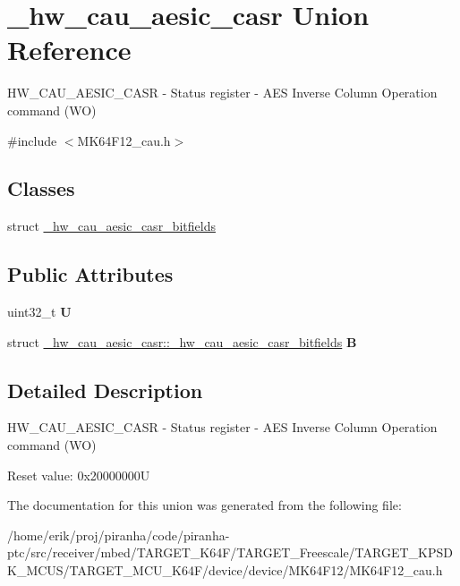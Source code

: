 \hypertarget{union__hw__cau__aesic__casr}{}\section{\+\_\+hw\+\_\+cau\+\_\+aesic\+\_\+casr Union Reference}
\label{union__hw__cau__aesic__casr}


H\+W\+\_\+\+C\+A\+U\+\_\+\+A\+E\+S\+I\+C\+\_\+\+C\+A\+SR -\/ Status register -\/ A\+ES Inverse Column Operation command (WO)  




{\ttfamily \#include $<$M\+K64\+F12\+\_\+cau.\+h$>$}

\subsection*{Classes}
\begin{DoxyCompactItemize}
\item 
struct \hyperlink{struct__hw__cau__aesic__casr_1_1__hw__cau__aesic__casr__bitfields}{\+\_\+hw\+\_\+cau\+\_\+aesic\+\_\+casr\+\_\+bitfields}
\end{DoxyCompactItemize}
\subsection*{Public Attributes}
\begin{DoxyCompactItemize}
\item 
uint32\+\_\+t {\bfseries U}\hypertarget{union__hw__cau__aesic__casr_a73b633957c2c868f374f36d24749867f}{}\label{union__hw__cau__aesic__casr_a73b633957c2c868f374f36d24749867f}

\item 
struct \hyperlink{struct__hw__cau__aesic__casr_1_1__hw__cau__aesic__casr__bitfields}{\+\_\+hw\+\_\+cau\+\_\+aesic\+\_\+casr\+::\+\_\+hw\+\_\+cau\+\_\+aesic\+\_\+casr\+\_\+bitfields} {\bfseries B}\hypertarget{union__hw__cau__aesic__casr_a266f7860035d8f428a56a5547b5c5433}{}\label{union__hw__cau__aesic__casr_a266f7860035d8f428a56a5547b5c5433}

\end{DoxyCompactItemize}


\subsection{Detailed Description}
H\+W\+\_\+\+C\+A\+U\+\_\+\+A\+E\+S\+I\+C\+\_\+\+C\+A\+SR -\/ Status register -\/ A\+ES Inverse Column Operation command (WO) 

Reset value\+: 0x20000000U 

The documentation for this union was generated from the following file\+:\begin{DoxyCompactItemize}
\item 
/home/erik/proj/piranha/code/piranha-\/ptc/src/receiver/mbed/\+T\+A\+R\+G\+E\+T\+\_\+\+K64\+F/\+T\+A\+R\+G\+E\+T\+\_\+\+Freescale/\+T\+A\+R\+G\+E\+T\+\_\+\+K\+P\+S\+D\+K\+\_\+\+M\+C\+U\+S/\+T\+A\+R\+G\+E\+T\+\_\+\+M\+C\+U\+\_\+\+K64\+F/device/device/\+M\+K64\+F12/M\+K64\+F12\+\_\+cau.\+h\end{DoxyCompactItemize}
